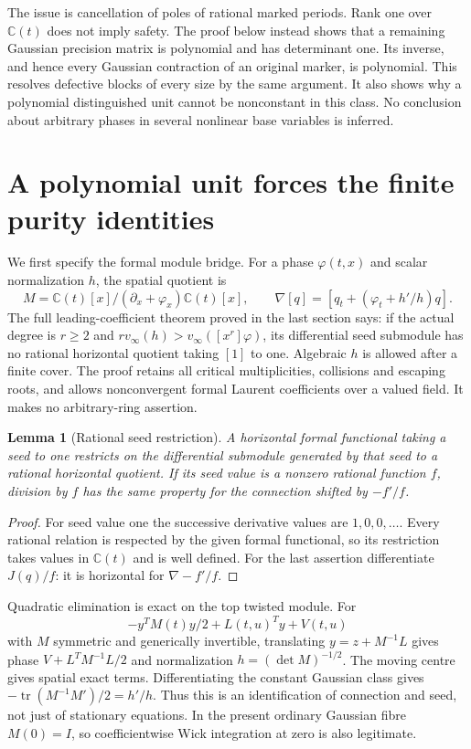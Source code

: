 \documentclass[11pt]{article}
\newtheorem{lemma}[theorem]{Lemma}
\theoremstyle{definition}\newtheorem{definition}[theorem]{Definition}
\theoremstyle{remark}\newtheorem{remark}[theorem]{Remark}
\newcommand{\C}{\mathbb C}
\begin{document}
The issue is cancellation of poles of rational marked periods.
Rank one over $\C(t)$ does not imply safety. The proof below
instead shows that a remaining Gaussian precision matrix is
polynomial and has determinant one. Its inverse, and hence
every Gaussian contraction of an original marker, is polynomial.
This resolves defective blocks of every size by the same argument.
It also shows why a polynomial distinguished unit cannot be
nonconstant in this class. No conclusion about arbitrary phases
in several nonlinear base variables is inferred.

\section{A polynomial unit forces the finite purity identities}

We first specify the formal module bridge. For a phase $\varphi(t,x)$
and scalar normalization $h$, the spatial quotient is
\[
 M=\C(t)[x]/(\partial_x+\varphi_x)\C(t)[x],\qquad
 \nabla[q]=[q_t+(\varphi_t+h'/h)q].
\]
The full leading-coefficient theorem proved in the last section says:
if the actual degree is $r\ge2$ and
$r v_\infty(h)>v_\infty([x^r]\varphi)$, its differential seed
submodule has no rational horizontal quotient taking $[1]$ to one.
Algebraic $h$ is allowed after a finite cover. The proof retains
all critical multiplicities, collisions and escaping roots, and
allows nonconvergent formal Laurent coefficients over a valued
field. It makes no arbitrary-ring assertion.

\begin{lemma}[Rational seed restriction]\label{lem:seedfunctional}
A horizontal formal functional taking a seed to one restricts on
the differential submodule generated by that seed to a rational
horizontal quotient. If its seed value is a nonzero rational
function $f$, division by $f$ has the same property for the
connection shifted by $-f'/f$.
\end{lemma}
\begin{proof}
For seed value one the successive derivative values are
$1,0,0,\ldots$. Every rational relation is respected by the
given formal functional, so its restriction takes values in
$\C(t)$ and is well defined. For the last assertion differentiate
$J(q)/f$: it is horizontal for $\nabla-f'/f$.
\end{proof}

Quadratic elimination is exact on the top twisted module. For
\[
 -y^TM(t)y/2+L(t,u)^Ty+V(t,u)
\]
with $M$ symmetric and generically invertible, translating
$y=z+M^{-1}L$ gives phase $V+L^TM^{-1}L/2$ and normalization
$h=(\det M)^{-1/2}$. The moving centre gives spatial exact
terms. Differentiating the constant Gaussian class gives
$-\operatorname{tr}(M^{-1}M')/2=h'/h$. Thus this is an
identification of connection and seed, not just of stationary
equations. In the present ordinary Gaussian fibre $M(0)=I$,
so coefficientwise Wick integration at zero is also legitimate.
\end{document}
